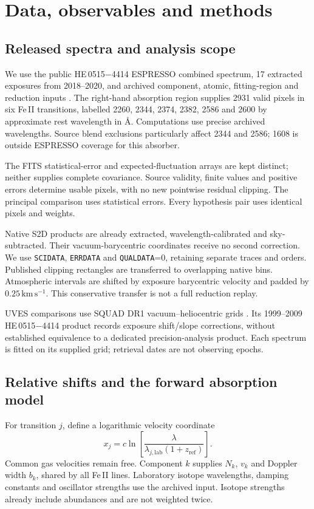 \section{Data, observables and methods}
\label{sec:methods}

\subsection{Released spectra and analysis scope}
\label{sec:data}
We use the public HE\,0515$-$4414 ESPRESSO combined spectrum, 17 extracted exposures from 2018--2020, and archived component, atomic, fitting-region and reduction inputs \citep{Murphy2022ESPRESSO}. The right-hand absorption region supplies 2931 valid pixels in six Fe\,II transitions, labelled 2260, 2344, 2374, 2382, 2586 and 2600 by approximate rest wavelength in \AA. Computations use precise archived wavelengths. Source blend exclusions particularly affect 2344 and 2586; 1608 is outside ESPRESSO coverage for this absorber.

The FITS statistical-error and expected-fluctuation arrays are kept distinct; neither supplies complete covariance. Source validity, finite values and positive errors determine usable pixels, with no new pointwise residual clipping. The principal comparison uses statistical errors. Every hypothesis pair uses identical pixels and weights.

Native S2D products are already extracted, wavelength-calibrated and sky-subtracted. Their vacuum-barycentric coordinates receive no second correction. We use \texttt{SCIDATA}, \texttt{ERRDATA} and \texttt{QUALDATA}=0, retaining separate traces and orders. Published clipping rectangles are transferred to overlapping native bins. Atmospheric intervals are shifted by exposure barycentric velocity and padded by $0.25\,\mathrm{km\,s^{-1}}$. This conservative transfer is not a full reduction replay.

UVES comparisons use SQUAD DR1 vacuum--heliocentric grids \citep{Murphy2019SQUAD}. Its 1999--2009 HE\,0515$-$4414 product records exposure shift/slope corrections, without established equivalence to a dedicated precision-analysis product. Each spectrum is fitted on its supplied grid; retrieval dates are not observing epochs.

\subsection{Relative shifts and the forward absorption model}
\label{sec:estimand}
For transition $j$, define a logarithmic velocity coordinate
\begin{equation}
 x_j=c\ln\!\left[\frac{\lambda}{\lambda_{j,\mathrm{lab}}(1+z_{
 \mathrm{ref}})}\right].
 \label{eq:velocity_coordinate}
\end{equation}
Common gas velocities remain free. Component $k$ supplies $N_k$, $v_k$ and Doppler width $b_k$, shared by all Fe\,II lines. Laboratory isotope wavelengths, damping constants and oscillator strengths use the archived \citet{MurphyBerengut2014} input. Isotope strengths already include abundances and are not weighted twice.

